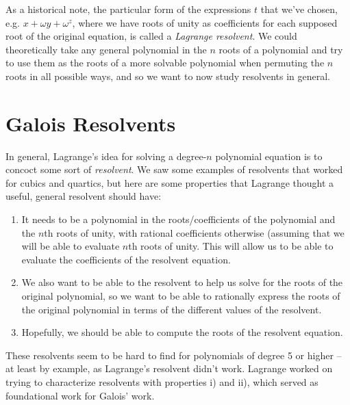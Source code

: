 \documentclass[12pt]{scrartcl}
\begin{document}
As a historical note, the particular form of the expressions $t$ that we've chosen, e.g. $x + \omega y + \omega^z$, where we have roots of unity as coefficients for each supposed root of the original equation, is called a \textit{Lagrange resolvent}. We could theoretically take any general polynomial in the $n$ roots of a polynomial and try to use them as the roots of a more solvable polynomial when permuting the $n$ roots in all possible ways, and so we want to now study resolvents in general. 


\section{Galois Resolvents}
In general, Lagrange's idea for solving a degree-$n$ polynomial equation is to concoct some sort of \textit{resolvent}. We saw some examples of resolvents that worked for cubics and quartics, but here are some properties that Lagrange thought a useful, general resolvent should have: 
\begin{enumerate}[label=\roman*)]
    \item It needs to be a polynomial in the roots/coefficients of the polynomial and the $n$th roots of unity, with rational coefficients otherwise (assuming that we will be able to evaluate $n$th roots of unity. This will allow us to be able to evaluate the coefficients of the resolvent equation. 
    \item We also want to be able to the resolvent to help us solve for the roots of the original polynomial, so we want to be able to rationally express the roots of the original polynomial in terms of the different values of the resolvent. 
    \item Hopefully, we should be able to compute the roots of the resolvent equation.
\end{enumerate}
These resolvents seem to be hard to find for polynomials of degree 5 or higher -- at least by example, as Lagrange's resolvent didn't work. Lagrange worked on trying to characterize resolvents with properties i) and ii), which served as foundational work for Galois' work. 
\end{document}
